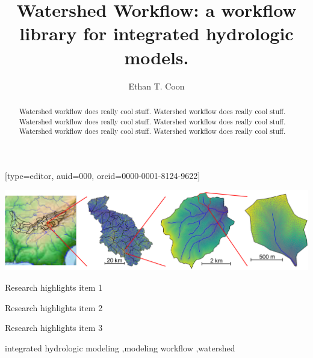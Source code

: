 \documentclass[a4paper,fleqn]{cas-dc}
\begin{document}
\let\WriteBookmarks\relax
\def\floatpagepagefraction{1}
\def\textpagefraction{.001}

\title [mode = title]{Watershed Workflow: a workflow library for integrated hydrologic models.}                      
\tnotemark[1]


\author[1]{Ethan T. Coon}[type=editor,
                      auid=000,
                      orcid=0000-0001-8124-9622]
\cormark[1]
\address[1]{Climate Change Science Institute \& Environmental Sciences Division, Oak Ridge National Laboratory, 1 Bethel Valley Road, Oak Ridge, TN, 37830, USA}

\begin{abstract}
Watershed workflow does really cool stuff.
Watershed workflow does really cool stuff.
Watershed workflow does really cool stuff.
Watershed workflow does really cool stuff.
Watershed workflow does really cool stuff.
Watershed workflow does really cool stuff.
\end{abstract}

\begin{graphicalabstract}
\includegraphics[width=\textwidth]{figs2/watersheds/watershed_workflow.png}
\end{graphicalabstract}

\begin{highlights}
\item Research highlights item 1
\item Research highlights item 2
\item Research highlights item 3
\end{highlights}

\begin{keywords}
integrated hydrologic modeling \sep modeling workflow \sep watershed 
\end{keywords}


\maketitle
\end{document}
